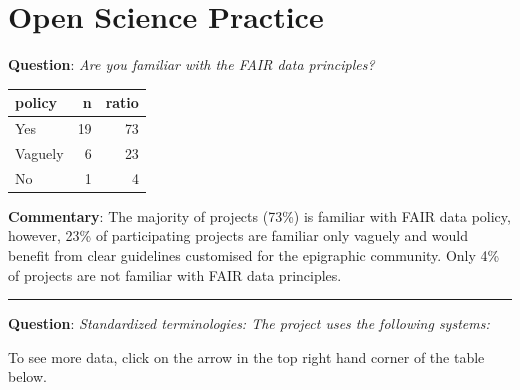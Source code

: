 \documentclass[
  12pt,
]{scrreprt}
\begin{document}
\hypertarget{open-science-practice-1}{%
\section{Open Science Practice}\label{open-science-practice-1}}

\textbf{Question}: \emph{Are you familiar with the FAIR data
principles?}

\begin{longtable}[]{@{}lrr@{}}
\toprule
policy & n & ratio \\
\midrule
\endhead
Yes & 19 & 73 \\
Vaguely & 6 & 23 \\
No & 1 & 4 \\
\bottomrule
\end{longtable}

\textbf{Commentary}: The majority of projects (73\%) is familiar with
FAIR data policy, however, 23\% of participating projects are familiar
only vaguely and would benefit from clear guidelines customised for the
epigraphic community. Only 4\% of projects are not familiar with FAIR
data principles.

\begin{center}\rule{0.5\linewidth}{0.5pt}\end{center}

\textbf{Question}: \emph{Standardized terminologies: The project uses
the following systems:}

To see more data, click on the arrow in the top right hand corner of the
table below.
\end{document}
